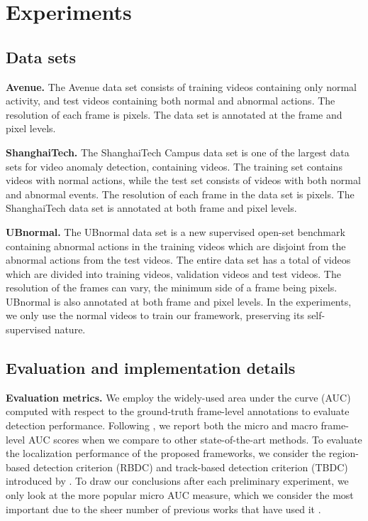 \documentclass[times,twocolumn,final,authoryear]{elsarticle}
\begin{document}
\section{Experiments}


\subsection{Data sets}


\noindent
\textbf{Avenue.} The Avenue \citep{Lu-ICCV-2013} data set consists of  training videos containing only normal activity, and  test videos containing both normal and abnormal actions. The resolution of each frame is  pixels. The data set is annotated at the frame and pixel levels.

\noindent
\textbf{ShanghaiTech.} The ShanghaiTech Campus \citep{Luo-ICCV-2017} data set is one of the largest data sets for video anomaly detection, containing  videos. The training set contains  videos with normal actions, while the test set consists of  videos with both normal and abnormal events. The resolution of each frame in the data set is  pixels. The ShanghaiTech data set is annotated at both frame and pixel levels.

\noindent
\textbf{UBnormal.} The UBnormal \citep{Acsintoae-CVPR-2022} data set is a new supervised open-set benchmark containing abnormal actions in the training videos which are disjoint from the abnormal actions from the test videos. The entire data set has a total of  videos which are divided into  training videos,  validation videos and  test videos. The resolution of the frames can vary, the minimum side of a frame being  pixels. UBnormal is also annotated at both frame and pixel levels. In the experiments, we only use the normal videos to train our framework, preserving its self-supervised nature.

\subsection{Evaluation and implementation details}


\noindent
\textbf{Evaluation metrics.}
We employ the widely-used area under the curve (AUC) computed with respect to the ground-truth frame-level annotations to evaluate detection performance. Following \citep{Acsintoae-CVPR-2022, Georgescu-TPAMI-2021, Ristea-CVPR-2022}, we report both the micro and macro frame-level AUC scores when we compare to other state-of-the-art methods. To evaluate the localization performance of the proposed frameworks, we consider the region-based detection criterion (RBDC) and track-based detection criterion (TBDC) introduced by \cite{Ramachandra-WACV-2020a}. To draw our conclusions after each preliminary experiment, we only look at the more popular micro AUC measure, which we consider the most important due to the sheer number of previous works that have used it \citep{Ramachandra-PAMI-2020}.
\end{document}
